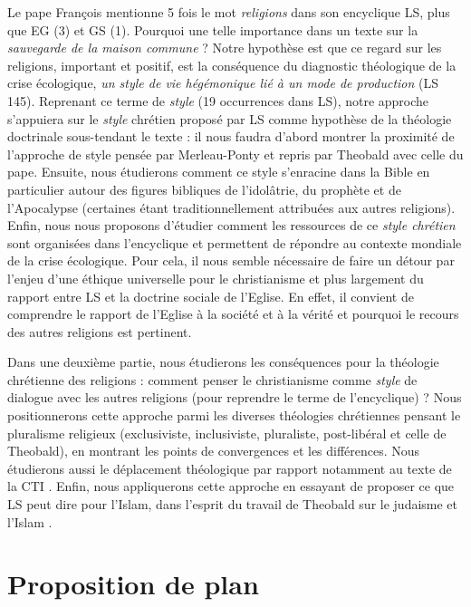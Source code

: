 Le pape François mentionne 5 fois le mot \textit{religions} dans son encyclique LS, plus que EG (3) et GS (1). Pourquoi une telle importance dans un texte sur la \textit{sauvegarde de la maison commune} ? Notre hypothèse est que ce regard sur les religions, important et positif, est la conséquence du diagnostic théologique de la crise écologique,  \textit{un \emph{style} de vie hégémonique lié à un mode de production} (LS 145). Reprenant ce terme de \textit{style} (19 occurrences dans LS), notre approche s'appuiera sur le \textit{style} chrétien proposé par LS comme hypothèse de la théologie doctrinale sous-tendant le texte : il nous faudra d'abord montrer la proximité de l'approche de style pensée par Merleau-Ponty et repris par Theobald \cite{theobald_christianisme_2007} avec celle du pape. Ensuite, nous étudierons comment ce style s'enracine dans la Bible en particulier autour des figures bibliques de l'idolâtrie, du prophète et de l'Apocalypse (certaines étant traditionnellement attribuées aux autres religions). Enfin, nous nous proposons d'étudier comment les ressources  de ce \textit{style chrétien} sont organisées dans l'encyclique et permettent de répondre au contexte mondiale de la crise écologique. Pour cela, il nous semble nécessaire de faire un détour par l'enjeu d'une éthique universelle pour le christianisme et plus largement du rapport entre LS et la doctrine sociale de l'Eglise. En effet, il convient de comprendre le rapport de l'Eglise à la société et à la vérité et pourquoi le recours des autres religions est pertinent. 


Dans une deuxième partie, nous étudierons les conséquences pour la théologie chrétienne des religions : comment penser le christianisme comme \textit{style} de dialogue avec les autres religions (pour reprendre le terme de l'encyclique) ?  Nous positionnerons cette approche parmi les diverses théologies chrétiennes pensant le pluralisme religieux (exclusiviste, inclusiviste, pluraliste, post-libéral et celle de Theobald), en montrant les points de convergences et les différences. Nous étudierons aussi le déplacement théologique par rapport notamment au texte de la CTI \cite{commission_theologique_internationale_christianisme_1997}.
Enfin, nous appliquerons cette approche en essayant de proposer ce que LS peut dire pour l'Islam, dans l'esprit du travail de Theobald sur le judaisme et l'Islam \cite{theobald_christianisme_2007}. 
 


\section{Proposition de plan}


